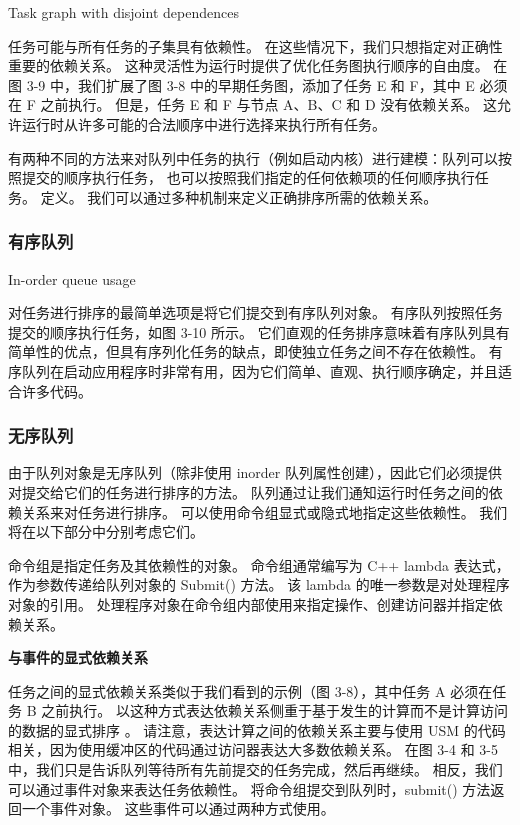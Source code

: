 {\color{red} Task graph with disjoint dependences}

任务可能与所有任务的子集具有依赖性。 在这些情况下，我们只想指定对正确性重要的依赖关系。 
这种灵活性为运行时提供了优化任务图执行顺序的自由度。 
在图 3-9 中，我们扩展了图 3-8 中的早期任务图，添加了任务 E 和 F，其中 E 必须在 F 之前执行。
但是，任务 E 和 F 与节点 A、B、C 和 D 没有依赖关系。 这允许运行时从许多可能的合法顺序中进行选择来执行所有任务。

有两种不同的方法来对队列中任务的执行（例如启动内核）进行建模：队列可以按照提交的顺序执行任务，
也可以按照我们指定的任何依赖项的任何顺序执行任务。 定义。 我们可以通过多种机制来定义正确排序所需的依赖关系。

\subsubsection{有序队列}
{\color{red} In-order queue usage}

对任务进行排序的最简单选项是将它们提交到有序队列对象。 有序队列按照任务提交的顺序执行任务，如图 3-10 所示。 
它们直观的任务排序意味着有序队列具有简单性的优点，但具有序列化任务的缺点，即使独立任务之间不存在依赖性。 
有序队列在启动应用程序时非常有用，因为它们简单、直观、执行顺序确定，并且适合许多代码。

\subsubsection{无序队列}
由于队列对象是无序队列（除非使用 inorder 队列属性创建），因此它们必须提供对提交给它们的任务进行排序的方法。 
队列通过让我们通知运行时任务之间的依赖关系来对任务进行排序。 可以使用命令组显式或隐式地指定这些依赖性。 
我们将在以下部分中分别考虑它们。

命令组是指定任务及其依赖性的对象。 命令组通常编写为 C++ lambda 表达式，作为参数传递给队列对象的 Submit() 方法。 
该 lambda 的唯一参数是对处理程序对象的引用。 处理程序对象在命令组内部使用来指定操作、创建访问器并指定依赖关系。

\textbf{与事件的显式依赖关系}

任务之间的显式依赖关系类似于我们看到的示例（图 3-8），其中任务 A 必须在任务 B 之前执行。
以这种方式表达依赖关系侧重于基于发生的计算而不是计算访问的数据的显式排序 。 
请注意，表达计算之间的依赖关系主要与使用 USM 的代码相关，因为使用缓冲区的代码通过访问器表达大多数依赖关系。 
在图 3-4 和 3-5 中，我们只是告诉队列等待所有先前提交的任务完成，然后再继续。 
相反，我们可以通过事件对象来表达任务依赖性。 将命令组提交到队列时，submit() 方法返回一个事件对象。 
这些事件可以通过两种方式使用。

